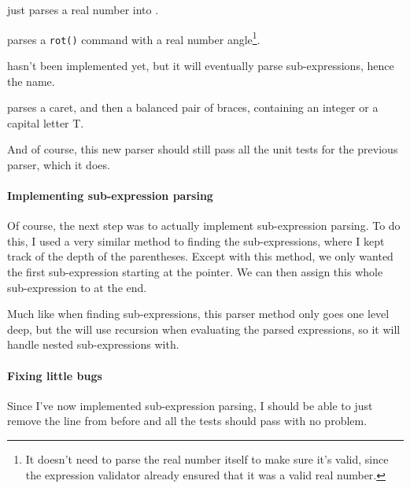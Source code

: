 \documentclass[../development.tex]{subfiles}
\begin{document}
 just parses a real number into .

 parses a \texttt{rot()} command with a real number angle\footnote{It doesn't need to parse the real number itself to make sure it's valid, since the expression validator already ensured that it was a valid real number.}.

 hasn't been implemented yet, but it will eventually parse sub-expressions, hence the name.

 parses a caret, and then a balanced pair of braces, containing an integer or a capital letter T.

And of course, this new parser should still pass all the unit tests for the previous parser, which it does.


\paragraph{Implementing sub-expression parsing\label{development:making-v0.2.2:parsing-parentheses:implementing-sub-expression-parsing}}

Of course, the next step was to actually implement sub-expression parsing. To do this, I used a very similar method to finding the sub-expressions, where I kept track of the depth of the parentheses. Except with this method, we only wanted the first sub-expression starting at the pointer. We can then assign this whole sub-expression to  at the end.

Much like when finding sub-expressions, this parser method only goes one level deep, but the  will use recursion when evaluating the parsed expressions, so it will handle nested sub-expressions with.


\paragraph{Fixing little bugs\label{development:making-v0.2.2:parsing-parentheses:fixing-little-bugs}}

Since I've now implemented sub-expression parsing, I should be able to just remove the  line from before and all the tests should pass with no problem.
\end{document}
